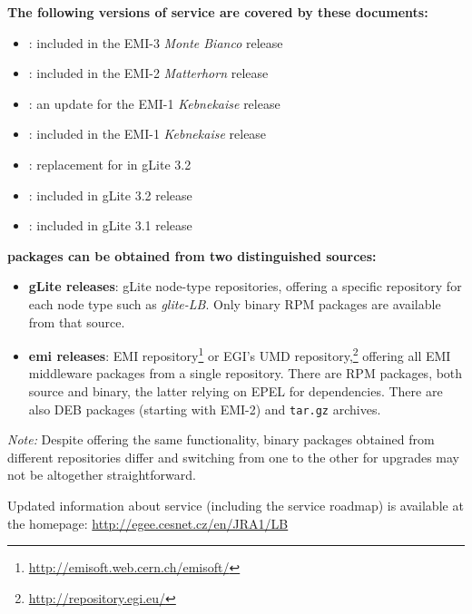 \textbf{The following versions of \LB service are covered by these documents:}
\begin{itemize}
\item {}: included in the EMI-3 \emph{Monte Bianco} release
\item {}: included in the EMI-2 \emph{Matterhorn} release
\item {}: an update for the EMI-1 \emph{Kebnekaise} release
\item {}: included in the EMI-1 \emph{Kebnekaise} release
\item {}: replacement for  in gLite 3.2
\item {}: included in gLite 3.2 release
\item {}: included in gLite 3.1 release
\end{itemize}

\textbf{\LB packages can be obtained from two distinguished sources:}

\nopagebreak
\begin{itemize}
\item \textbf{gLite releases}: gLite node-type repositories, offering a specific repository for each node type such as \emph{glite-LB}. Only binary RPM packages are available from that source.
\item \textbf{emi releases}: EMI repository\footnote{\url{http://emisoft.web.cern.ch/emisoft/}} or EGI's UMD repository,\footnote{\url{http://repository.egi.eu/}} offering all EMI middleware packages from a single repository. There are RPM packages, both source and binary, the latter relying on EPEL for dependencies. There are also DEB packages (starting with EMI-2) and \texttt{tar.gz} archives.
\end{itemize}

\emph{Note:} Despite offering the same functionality, binary packages obtained from different repositories differ and switching from one to the other for upgrades may not be altogether straightforward.

Updated information about \LB service (including the \LB service roadmap) is available at the
\LB homepage:
\href{http://egee.cesnet.cz/en/JRA1/LB}{http://egee.cesnet.cz/en/JRA1/LB}

